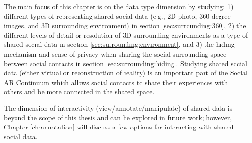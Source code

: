 The main focus of this chapter is on the data type dimension by studying: 1) different types of representing shared social data (e.g., 2D photo, 360-degree images, and 3D surrounding environment) in section \ref{sec:surrounding:360}, 2) the different levels of detail or resolution of 3D surrounding environments as a type of shared social data in section \ref{sec:surrounding:environment}, and 3) the hiding mechanism and sense of privacy when sharing the social surrounding space between social contacts in section \ref{sec:surrounding:hiding}. Studying shared social data (either virtual or reconstruction of reality) is an important part of the Social AR Continuum which allows social contacts to share their experiences with others and be more connected in the shared space. 

The dimension of interactivity (view/annotate/manipulate) of shared data is beyond the scope of this thesis and can be explored in future work; however, Chapter \ref{ch:annotation} will discuss a few options for interacting with shared social data.






